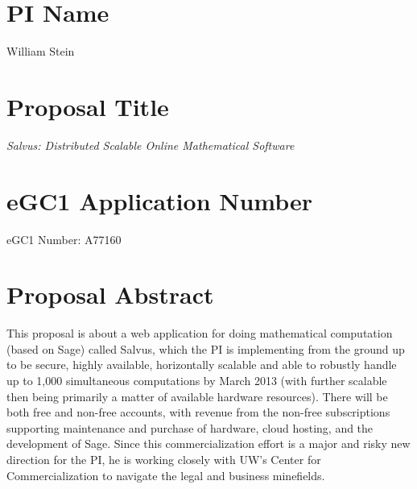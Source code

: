\documentclass[11pt]{article}
\begin{document}
\mbox{}\vspace{4ex}

\section*{PI Name} 
William Stein

\vspace{3ex}
\section*{Proposal Title} 
{\em Salvus: Distributed Scalable Online Mathematical Software}

\vspace{3ex}

\section*{eGC1 Application Number} 
eGC1 Number: A77160

\vspace{3ex}

\section*{Proposal Abstract} 
This proposal is about a web application for doing mathematical
computation (based on Sage) called Salvus, which the PI is
implementing from the ground up to be secure, highly available,
horizontally scalable and able to robustly handle up to 1,000
simultaneous computations by March 2013 (with further scalable then
being primarily a matter of available hardware resources).  There will
be both free and non-free accounts, with revenue from the non-free
subscriptions supporting maintenance and purchase of hardware, cloud
hosting, and the development of Sage.  Since this commercialization
effort is a major and risky new direction for the PI, he is working
closely with UW's Center for Commercialization to navigate the legal
and business minefields.

\vspace{3ex}
\end{document}
